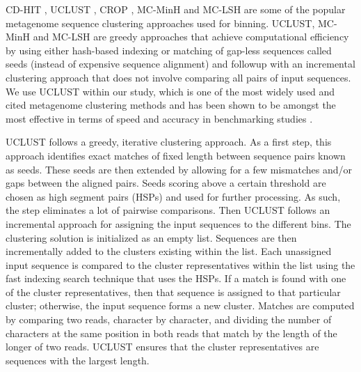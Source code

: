 CD-HIT \cite{Li01072006}, UCLUST \cite{Edgar10}, CROP \cite{Hao01032011}, MC-MinH \cite{sdm2013a} and 
MC-LSH \cite{bibm2012}
are some of the popular 
metagenome sequence clustering approaches used for binning. 
%
UCLUST, MC-MinH and MC-LSH  are
greedy approaches that achieve computational efficiency 
by using either hash-based indexing or matching of gap-less sequences called seeds (instead 
of expensive sequence alignment) and followup with an incremental clustering approach 
that does not involve comparing all pairs of input sequences. We use UCLUST within our study, which is one of the most widely used and cited metagenome clustering methods and has been shown to be amongst the most effective in terms of speed and accuracy in benchmarking studies \cite{bonder090112, sun042711}. 
%

UCLUST \cite{Edgar10} follows a greedy, iterative clustering approach. As a first 
step, this approach identifies exact matches of fixed length between sequence pairs known 
as seeds. These seeds are then extended by allowing for a few mismatches and/or gaps between 
the aligned pairs. Seeds scoring above a certain threshold are chosen as high segment pairs (HSPs)  and used for further processing. As such, the step eliminates a lot of pairwise comparisons. Then UCLUST follows an incremental approach for assigning the input sequences to the different bins. The clustering solution is initialized as an empty list. Sequences are then incrementally added to the clusters existing within the list. Each unassigned input sequence is compared to the cluster representatives within the list using the fast indexing search technique that uses the HSPs. If a match is found with one of the cluster representatives, then that sequence is assigned to that particular cluster; otherwise, the input sequence forms a new cluster. Matches are computed by comparing two reads, character by character, and dividing the number of characters at the same position in both reads that match by the length of the longer of two reads. UCLUST ensures that the cluster representatives are sequences with the largest length. 
